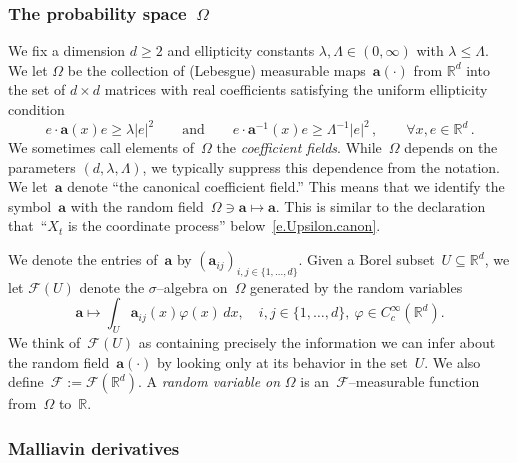 \documentclass[11pt]{article} %
\numberwithin{equation}{section}
\theoremstyle{definition}
\newcommand*{\R}{\ensuremath{\mathbb{R}}}
\newcommand*{\Rd}{\ensuremath{\mathbb{R}^d}}
\renewcommand{\a}{\mathbf{a}}
\newcommand{\F}{\mathcal{F}}
\begin{document}
\subsubsection{The probability space~$\Omega$}
\label{ss.probspace} 

We fix a dimension $d\geq 2$ and ellipticity constants $\lambda,\Lambda \in (0,\infty)$ with $\lambda\leq \Lambda$. We let $\Omega$ be the collection of (Lebesgue) measurable maps~$\a(\cdot)$ from $\Rd$ into the set of $d\times d$ matrices with real coefficients satisfying
the uniform ellipticity condition
\begin{equation} 
\label{e.ellipticity}
e \cdot \a(x) e \geq \lambda |e|^2 
\qquad \mbox{and} \qquad 
e \cdot \a^{-1}(x) e \geq \Lambda^{-1} |e|^2 \,,
\qquad \forall x,e\in\Rd
\,. 
\end{equation}
We sometimes call elements of~$\Omega$ the \emph{coefficient fields}. 
While~$\Omega$ depends on the parameters $(d,\lambda,\Lambda)$, we typically suppress this dependence from the notation. 
We let~$\a$ denote ``the canonical coefficient field.'' This means that we identify the symbol~$\a$ with the random field~$\Omega \ni \a \mapsto \a$. This is similar to the declaration that~``$X_t$ is the coordinate process'' below~\eqref{e.Upsilon.canon}. 

\smallskip

We denote the entries of~$\a$ by $(\a_{ij})_{i,j\in\{1,\ldots,d\}}$. Given a Borel subset~$U\subseteq \Rd$, we let $\F(U)$ denote the $\sigma$--algebra on~$\Omega$ generated by the random variables 
\begin{equation} 
\label{e.FU}
\a \mapsto \int_U \a_{ij} (x) \varphi(x)\,dx, 
\quad 
i,j \in\{1,\ldots,d\}, 
\ 
\varphi\in C^\infty_c(\Rd). 
\end{equation}
We think of~$\F(U)$ as containing precisely the information we can infer about the random field~$\a(\cdot)$ by looking only at its behavior in the set~$U$. We also define~$\F:=\F(\Rd)$. A \emph{random variable on} $\Omega$ is an~$\F$--measurable function from~$\Omega$ to~$\R$. 



\subsubsection{Malliavin derivatives}
\end{document}
